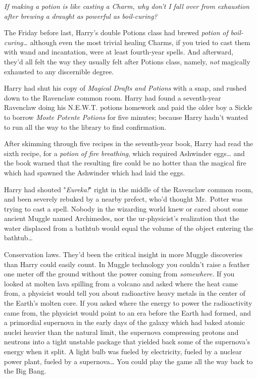 \emph{If making a potion is like casting a Charm, why don't I fall over from 
exhaustion after brewing a draught as powerful as boil-curing?}

The Friday before last, Harry's double Potions class had brewed \emph{potion of 
boil-curing{\ldots}} although even the most trivial healing Charms, if you 
tried to cast them with wand and incantation, were at least fourth-year spells. 
And afterward, they'd all felt the way they usually felt after Potions class, 
namely, \emph{not} magically exhausted to any discernible degree.

Harry had shut his copy of \emph{Magical Drafts and Potions} with a snap, and 
rushed down to the Ravenclaw common room. Harry had found a seventh-year 
Ravenclaw doing his N.E.W.T. potions homework and paid the older boy a Sickle 
to borrow \emph{Moste Potente Potions} for five minutes; because Harry hadn't 
wanted to run all the way to the library to find confirmation.

After skimming through five recipes in the seventh-year book, Harry had read 
the sixth recipe, for a \emph{potion of fire breathing}, which required 
Ashwinder eggs{\ldots} and the book warned that the resulting fire could be no 
hotter than the magical fire which had spawned the Ashwinder which had laid the 
eggs.

Harry had shouted "\emph{Eureka!}" right in the middle of the Ravenclaw common 
room, and been severely rebuked by a nearby prefect, who'd thought Mr.~Potter 
was trying to cast a spell. Nobody in the wizarding world knew or cared about 
some ancient Muggle named Archimedes, nor the ur-physicist's realization that 
the water displaced from a bathtub would equal the volume of the object 
entering the bathtub{\ldots}

Conservation laws. They'd been the critical insight in more Muggle discoveries 
than Harry could easily count. In Muggle technology you couldn't raise a 
feather one meter off the ground without the power coming from 
\emph{somewhere.} If you looked at molten lava spilling from a volcano and 
asked where the heat came from, a physicist would tell you about radioactive 
heavy metals in the center of the Earth's molten core. If you asked where the 
energy to power the radioactivity came from, the physicist would point to an 
era before the Earth had formed, and a primordial supernova in the early days 
of the galaxy which had baked atomic nuclei heavier than the natural limit, the 
supernova compressing protons and neutrons into a tight unstable package that 
yielded back some of the supernova's energy when it split. A light bulb was 
fueled by electricity, fueled by a nuclear power plant, fueled by a 
supernova{\ldots} You could play the game all the way back to the Big Bang.


